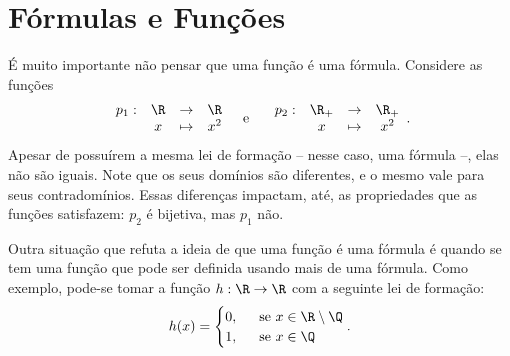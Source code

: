 \section{Fórmulas e Funções}

É muito importante não pensar que uma função é uma fórmula.
Considere as funções
%
$$\begin{array}{cccc}
p_1 : & \R & \to     & \R \\
     &  x & \mapsto & x^2
\end{array}
\text{\ \ \  e \ \ \ }
\begin{array}{cccc}
p_2 : & \R_+ & \to     & \R_+ \\
     &  x & \mapsto &  x^2
\end{array}.$$
%
Apesar de possuírem a mesma lei de formação -- nesse caso, uma fórmula --, elas não são iguais.
Note que os seus domínios são diferentes, e o mesmo vale para seus contradomínios.
Essas diferenças impactam, até, as propriedades que as funções satisfazem: $p_2$ é bijetiva, mas $p_1$ não.

Outra situação que refuta a ideia de que uma função é uma fórmula é quando se tem uma função que pode ser definida usando mais de uma fórmula.
Como exemplo, pode-se tomar a função $h:\R \to \R$ com a seguinte lei de formação:
%
     $$h(x) =  \begin{cases}
            0, &  \ \text{ se } x \in \R \setminus \Q \\
            1, & \ \text{ se } x \in \Q
            \end{cases} .$$